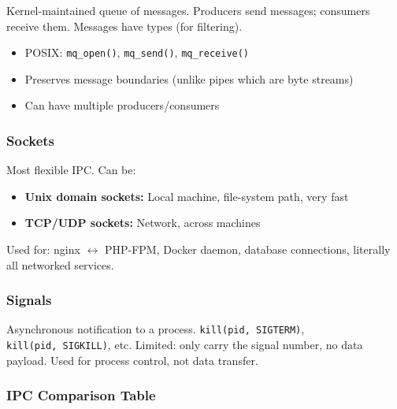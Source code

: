 \documentclass[11pt]{article}
\providecommand{\tightlist}{\setlength{\itemsep}{1pt}\setlength{\parskip}{0pt}}
\begin{document}
Kernel-maintained queue of messages. Producers send messages; consumers receive them. Messages have types (for filtering).

\begin{itemize}
\tightlist
\item
  POSIX: \texttt{mq\_open()}, \texttt{mq\_send()}, \texttt{mq\_receive()}
\item
  Preserves message boundaries (unlike pipes which are byte streams)
\item
  Can have multiple producers/consumers
\end{itemize}

\subsubsection{Sockets}\label{sockets}

Most flexible IPC. Can be:

\begin{itemize}
\tightlist
\item
  \textbf{Unix domain sockets:} Local machine, file-system path, very fast
\item
  \textbf{TCP/UDP sockets:} Network, across machines
\end{itemize}

Used for: nginx \(\leftrightarrow\) PHP-FPM, Docker daemon, database connections, literally all networked services.

\subsubsection{Signals}\label{signals}

Asynchronous notification to a process. \texttt{kill(pid,\ SIGTERM)}, \texttt{kill(pid,\ SIGKILL)}, etc. Limited: only carry the signal number, no data payload. Used for process control, not data transfer.

\subsubsection{IPC Comparison Table}\label{ipc-comparison-table}
\end{document}
